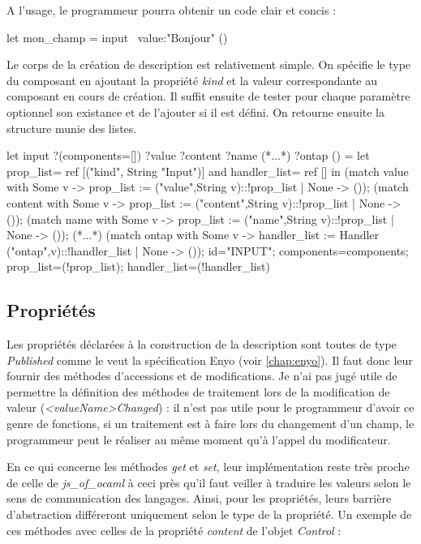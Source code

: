 \documentclass[11pt,a4paper]{report}
\begin{document}
A l'usage, le programmeur pourra obtenir un code clair et concis :
\begin{OCaml}
  let mon_champ = input ~value:"Bonjour" ()
\end{OCaml}

Le corps de la création de description est relativement simple.
On spécifie le type du composant en ajoutant la propriété \emph{kind} et la valeur
correspondante au composant en cours de création.
Il suffit ensuite de tester pour chaque paramètre optionnel son existance et de l'ajouter 
si il est défini. On retourne ensuite la structure munie des listes.
\begin{OCaml}
let input
	?(components=[])
	?value
        ?content
	?name
        (*...*)
	?ontap
	() =
   let prop_list= ref [("kind", String "Input")]
   and handler_list= ref [] in
   (match value with 
       Some v -> 
         prop_list := ("value",String v)::!prop_list 
     | None -> ());
   (match content with 
       Some v -> 
         prop_list := ("content",String v)::!prop_list 
     | None -> ());
  (match name with 
       Some v -> 
         prop_list := ("name",String v)::!prop_list
     | None -> ());
  (*...*)
  (match ontap with 
       Some v -> 
         handler_list := Handler ("ontap",v)::!handler_list 
     | None -> ());
  {id="INPUT"; components=components;
  prop_list=(!prop_list); handler_list=(!handler_list)}
\end{OCaml}

\subsection{Propriétés}

Les propriétés déclarées à la construction de la description sont toutes de type \emph{Published}
comme le veut la spécification Enyo (voir \ref{chap:enyo}). Il faut donc leur fournir
des méthodes d'accessions et de modifications. Je n'ai pas jugé utile de permettre la définition
des méthodes de traitement lors de la modification de valeur (\emph{<valueName>Changed}) : 
il n'est pas utile pour le programmeur d'avoir ce genre de fonctions, si un traitement est à faire
lors du changement d'un champ, le programmeur peut le réaliser au même moment qu'à l'appel du
modificateur.

En ce qui concerne les méthodes \emph{get} et \emph{set}, leur implémentation reste très proche
de celle de \emph{js\_of\_ocaml} à ceci près qu'il faut veiller à traduire les valeurs selon le
sens de communication des langages.
Ainsi, pour les propriétés, leurs barrière d'abstraction différeront uniquement selon le type 
de la propriété. Un exemple de ces méthodes avec celles de la propriété \emph{content} 
de l'objet \emph{Control} :
\end{document}
